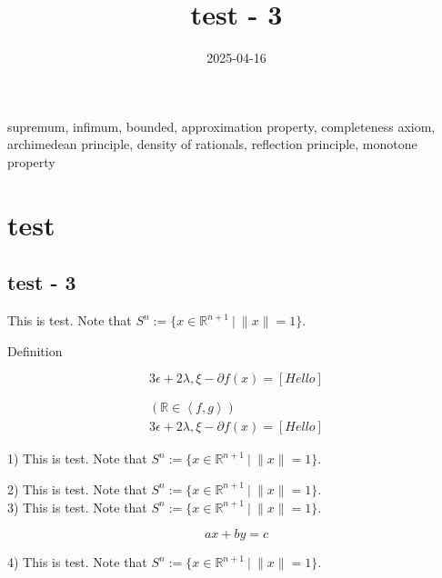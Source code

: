 \documentclass[11pt,reqno]{amsart}
\theoremstyle{definition}
\theoremstyle{remark}
\numberwithin{equation}{section}
\newcommand{\ep}{\epsilon}
\newcommand{\lx}{{\lambda, \xi}}
\newcommand{\pa}{\partial}
\renewcommand{\(}{\left(}
\renewcommand{\)}{\right)}
\renewcommand{\[}{\right[}
\renewcommand{\]}{\right]}
\newcommand{\R}{\mathbb{R}}
\newcommand{\inner}[2]{\left< #1, #2 \right>}
\newcommand{\test}[1]{\left[ #1 \right]}
\newcommand{\setdefine}{ \ \big| \ }
\newenvironment{text-box}{}{}
\newcommand{\tags}[1]{#1}
\newcommand{\subheading}[1]{#1}
\begin{document}
\title[]
{test - 3}

\date{2025-04-16}

\maketitle

\tags{
    supremum, infimum, bounded, approximation property, 
    completeness axiom, archimedean principle, density of rationals, 
    reflection principle, monotone property
}

\section{test}

\subsection{test - 3}

This is test. Note that $S^n := \{ x \in \R^{n+1} \setdefine \| x \| = 1 \}$.

\subheading{Definition}

\begin{equation}
    3 \epsilon + 2 \lx - \pa f(x) = \test{Hello}
\end{equation}

\begin{align}
    \( \R \in \inner{f}{g} \) \\
    3 \ep + 2 \lx - \pa f(x) = \test{Hello}
\end{align}

\begin{text-box}
    1) This is test. Note that $S^n := \{ x \in \R^{n+1} \setdefine \| x \| = 1 \}$.

    2) This is test. Note that $S^n := \{ x \in \R^{n+1} \setdefine \| x \| = 1 \}$. \\
    3) This is test. Note that $S^n := \{ x \in \R^{n+1} \setdefine \| x \| = 1 \}$.

    \begin{equation}
        ax + by = c
    \end{equation}
    
    4) This is test. Note that $S^n := \{ x \in \R^{n+1} \setdefine \| x \| = 1 \}$.
\end{text-box}
\end{document}
